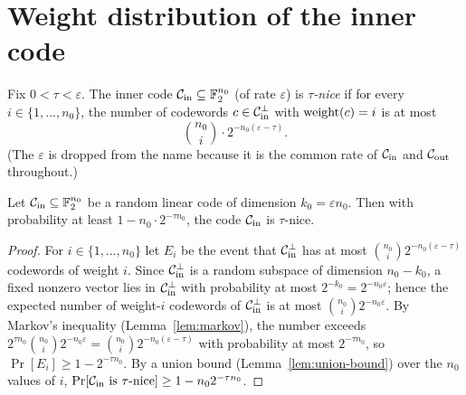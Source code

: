 \section{Weight distribution of the inner code}

\begin{definition}
  \label{def:tau-nice}
  Fix $0 < \tau < \varepsilon$. The inner code $\mathcal{C}_{\mathrm{in}} \subseteq \mathbb{F}_2^{n_0}$ (of
  rate $\varepsilon$) is \emph{$\tau$-nice} if for every $i \in \{1,\dots,n_0\}$,
  the number of codewords $c \in \mathcal{C}_{\mathrm{in}}^\perp$ with $\operatorname{weight}(c) = i$ is at most
  \[
    \binom{n_0}{i} \cdot 2^{-n_0(\varepsilon - \tau)} .
  \]
  (The $\varepsilon$ is dropped from the name because it is the common rate of
  $\mathcal{C}_{\mathrm{in}}$ and $\mathcal{C}_{\mathrm{out}}$ throughout.)
\end{definition}

\begin{lemma}
  \label{lem:tau-nice-random}
  Let $\mathcal{C}_{\mathrm{in}} \subseteq \mathbb{F}_2^{n_0}$ be a random linear code of dimension
  $k_0 = \varepsilon n_0$. Then with probability at least
  $1 - n_0 \cdot 2^{-\tau n_0}$, the code $\mathcal{C}_{\mathrm{in}}$ is $\tau$-nice.
\end{lemma}
\begin{proof}
  For $i \in \{1,\dots,n_0\}$ let $E_i$ be the event that $\mathcal{C}_{\mathrm{in}}^\perp$ has at
  most $\binom{n_0}{i}2^{-n_0(\varepsilon - \tau)}$ codewords of weight $i$.
  Since $\mathcal{C}_{\mathrm{in}}^\perp$ is a random subspace of dimension $n_0 - k_0$, a fixed
  nonzero vector lies in $\mathcal{C}_{\mathrm{in}}^\perp$ with probability at most $2^{-k_0} =
  2^{-n_0\varepsilon}$; hence the expected number of weight-$i$ codewords of
  $\mathcal{C}_{\mathrm{in}}^\perp$ is at most $\binom{n_0}{i}2^{-n_0\varepsilon}$. By Markov's
  inequality (Lemma~\ref{lem:markov}), the number exceeds
  $2^{\tau n_0}\binom{n_0}{i}2^{-n_0\varepsilon} =
  \binom{n_0}{i}2^{-n_0(\varepsilon-\tau)}$ with probability at most
  $2^{-\tau n_0}$, so $\Pr[E_i] \geq 1 - 2^{-\tau n_0}$. By a union bound
  (Lemma~\ref{lem:union-bound}) over the $n_0$ values of $i$,
  $\Pr[\mathcal{C}_{\mathrm{in}} \text{ is } \tau\text{-nice}] \geq 1 - n_0 2^{-\tau n_0}$.
\end{proof}

